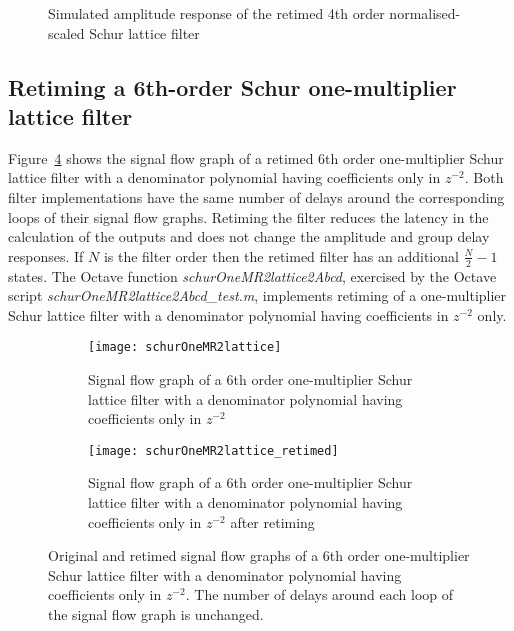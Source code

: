 \documentclass[a4paper,twoside,10pt,english]{report}
\begin{document}
\begin{figure}
\begin{center}
\scalebox{0.7}{}
\caption{Simulated amplitude response of the retimed 4th order normalised-scaled
  Schur lattice filter} 
\label{fig:schur-retimed-output-response}
\end{center}
\end{figure}
\subsection{\label{sec:Retiming-OneM-Schur-lattice-filter}Retiming a
6th-order Schur one-multiplier lattice filter}
Figure~\ref{fig:example-retiming-a-one-multplier-Schur-lattice-filter} shows the
signal flow graph of a retimed 6th order one-multiplier Schur lattice filter
with a denominator polynomial having coefficients only in $z^{-2}$. Both filter
implementations have the same number of delays around the corresponding loops of
their signal flow graphs. Retiming the filter reduces the latency in the
calculation of the outputs and does not change the amplitude and group delay
responses. If $N$ is the filter order then the retimed filter has an additional
$\frac{N}{2}-1$ states. The Octave function \emph{schurOneMR2lattice2Abcd},
exercised by the Octave script \emph{schurOneMR2lattice2Abcd\_test.m},
implements retiming of a one-multiplier Schur lattice filter with a denominator
polynomial having coefficients in $z^{-2}$ only.

\begin{figure}[!htbp]
\begin{center}
\begin{subfigure}{\textwidth}
\begin{center}
\texttt{[image: schurOneMR2lattice]}
\caption{Signal flow graph of a 6th order one-multiplier Schur lattice filter with a denominator polynomial having coefficients only in $z^{-2}$}
\label{subfig:example-one-multplier-Schur-lattice-filter}
\vspace{1cm}
\end{center}
\end{subfigure}
\begin{subfigure}{\textwidth}
\begin{center}
\texttt{[image: schurOneMR2lattice\_retimed]}
\caption{Signal flow graph of a 6th order one-multiplier Schur lattice filter with a denominator polynomial having coefficients only in $z^{-2}$ after retiming}
\label{subfig:example-retimed-one-multplier-Schur-lattice-filter}
\end{center}
\end{subfigure}
\vspace{1cm}
\caption{Original and retimed signal flow graphs of a 6th order one-multiplier
  Schur lattice filter with a denominator polynomial having coefficients only in
  $z^{-2}$. The number of delays around each loop of the signal flow
  graph is unchanged.}
\label{fig:example-retiming-a-one-multplier-Schur-lattice-filter}
\end{center}
\end{figure}
\end{document}
